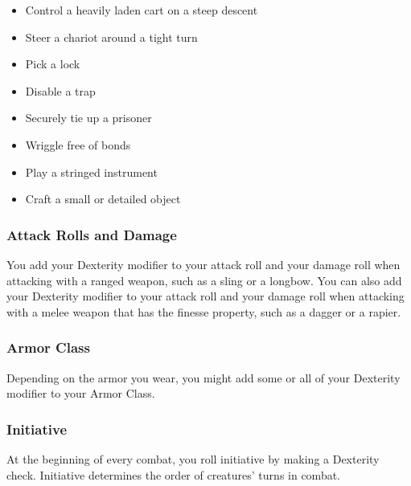 \begin{itemize}
\item Control a heavily laden cart on a steep descent
\item Steer a chariot around a tight turn
\item Pick a lock
\item Disable a trap
\item Securely tie up a prisoner
\item Wriggle free of bonds
\item Play a stringed instrument
\item Craft a small or detailed object
\end{itemize}

\subsubsection{Attack Rolls and Damage}

You add your Dexterity modifier to your attack roll and your damage roll when attacking with a ranged weapon, such as a sling or a longbow. You can also add your Dexterity modifier to your attack roll and your damage roll when attacking with a melee weapon that has the finesse property, such as a dagger or a rapier.

\subsubsection{Armor Class}

Depending on the armor you wear, you might add some or all of your Dexterity modifier to your Armor Class.

\subsubsection{Initiative}

At the beginning of every combat, you roll initiative by making a Dexterity check. Initiative determines the order of creatures' turns in combat.

